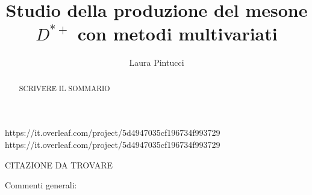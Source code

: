\documentclass[a4paper, twoside]{report}
\title{Studio della produzione del mesone $D^{*+}$ con metodi multivariati}
\author{Laura Pintucci}
\begin{document}

\thispagestyle{empty} 
https://it.overleaf.com/project/5d4947035cf196734f993729
\cleardoublepage
https://it.overleaf.com/project/5d4947035cf196734f993729


\thispagestyle{empty} 
\begin{flushright}%
\null {}

CITAZIONE DA TROVARE

\null
\end{flushright}





\begin{abstract}
SCRIVERE IL SOMMARIO
\end{abstract}


\tableofcontents
\listoffigures
\listoftables
Commenti generali: 












\end{document}

